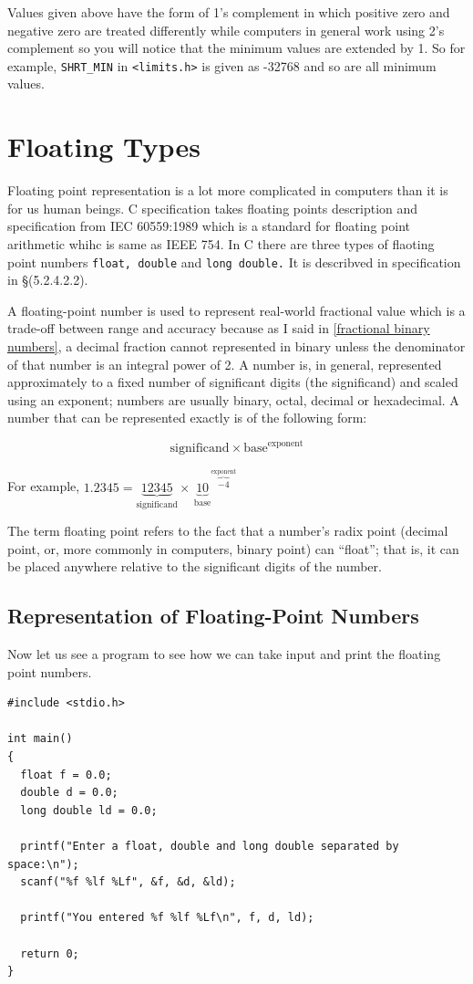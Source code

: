Values given above have the form of 1's complement in which positive zero and
negative zero are treated differently while computers in general work using 2's
complement so you will notice that the minimum values are extended by 1. So for
example, \texttt{SHRT\_MIN} in \texttt{<limits.h>} is given as -32768 and so
are all minimum values.

\section{Floating Types}
Floating point representation is a lot more complicated in computers than it
is for us human beings. C specification takes floating points description and
specification from IEC 60559:1989 which is a standard for floating point
arithmetic whihc is same as IEEE 754. In C there are three types of flaoting
point numbers \texttt{float, double} and \texttt{long double.} It is describved
in specification in \S(5.2.4.2.2).

A floating-point number is used to represent real-world fractional value which
is a trade-off between range and accuracy because as I said in \ref{fractional
  binary numbers}, a decimal fraction cannot represented in binary unless the
denominator of that number is an integral power of 2. A number is, in general,
represented approximately to a fixed number of significant digits (the
significand) and scaled using an exponent; numbers are usually binary, octal,
decimal or hexadecimal. A number that can be represented exactly is of the
following form:

$$\text{significand} \times \text{base}^\text{exponent}$$

For example, $1.2345 = \underbrace{12345}_\text{significand} \times \,\underbrace{10}_\text{base}\!\!\!\!\!\!^{\overbrace{-4}^\text{exponent}}$

The term floating point refers to the fact that a number's radix point (decimal
point, or, more commonly in computers, binary point) can ``float''; that is, it
can be placed anywhere relative to the significant digits of the number.

\subsection{Representation of Floating-Point Numbers}


Now let us see a program to see how we can take input and print the floating
point numbers.

\begin{Verbatim}[frame=single]
#include <stdio.h>

int main()
{
  float f = 0.0;
  double d = 0.0;
  long double ld = 0.0;

  printf("Enter a float, double and long double separated by space:\n");
  scanf("%f %lf %Lf", &f, &d, &ld);

  printf("You entered %f %lf %Lf\n", f, d, ld);

  return 0;
}
\end{Verbatim}

